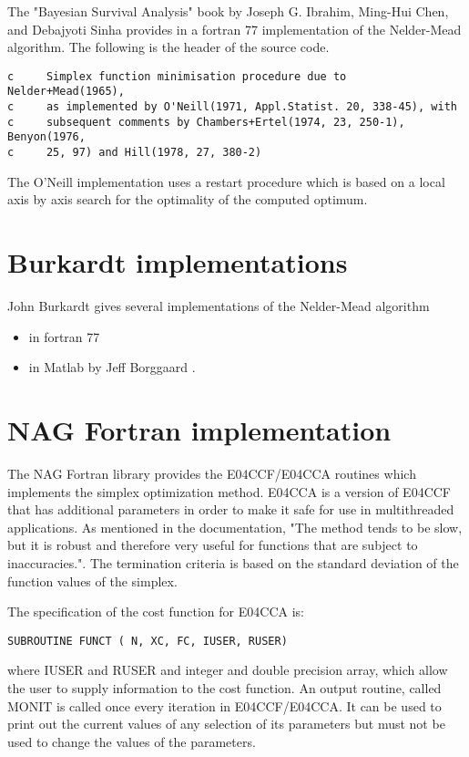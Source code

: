 The "Bayesian Survival Analysis" book by Joseph G. Ibrahim, Ming-Hui 
Chen, and Debajyoti Sinha provides in \cite{SurvivalBookOptim} a fortran 77 implementation 
of the Nelder-Mead algorithm. The following is the header of the source 
code.

\begin{verbatim}
c     Simplex function minimisation procedure due to Nelder+Mead(1965),
c     as implemented by O'Neill(1971, Appl.Statist. 20, 338-45), with
c     subsequent comments by Chambers+Ertel(1974, 23, 250-1), Benyon(1976,
c     25, 97) and Hill(1978, 27, 380-2)
\end{verbatim}

The O'Neill implementation uses a restart procedure which is 
based on a local axis by axis search for the optimality of the 
computed optimum.

\section{Burkardt implementations}

John Burkardt gives several implementations of the Nelder-Mead 
algorithm
\begin{itemize}
\item in fortran 77 \cite{Burkardtasa047} 
\item in Matlab by Jeff Borggaard \cite{BurkardtNelderMeadMatlab}.
\end{itemize}

\section{NAG Fortran implementation}

The NAG Fortran library provides the E04CCF/E04CCA routines \cite{NAGE04CCF} which
implements the simplex optimization method.
E04CCA is a version of E04CCF that has additional parameters 
in order to make it safe for use in multithreaded applications.
As mentioned in the documentation, "The method tends to be slow, but it 
is robust and therefore very useful for functions that are subject to inaccuracies.".
The termination criteria is based on the standard deviation of the function
values of the simplex.

The specification of the cost function for E04CCA is:
\begin{verbatim}
SUBROUTINE FUNCT ( N, XC, FC, IUSER, RUSER)
\end{verbatim}
where IUSER and RUSER and integer and double precision array, which allow the 
user to supply information to the cost function.
An output routine, called MONIT is called once every iteration in E04CCF/E04CCA.
It can be used to print out the current values of any selection of its parameters 
but must not be used to change the values of the parameters.

